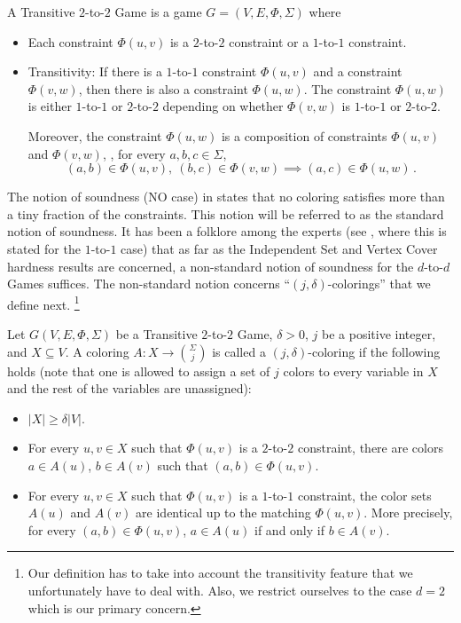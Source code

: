 \documentclass{toc}
\newcommand\card[1]{\left| {#1} \right|}
\begin{document}
\begin{definition}\label{def:trans_game}
A Transitive $2$-to-$2$ Game is a game $G=(V,E,\Phi,\Sigma)$ where
\begin{itemize}
\item Each constraint $\Phi(u,v)$ is a $2$-to-$2$ constraint or a $1$-to-$1$ constraint.
\item Transitivity: If there is a $1$-to-$1$ constraint $\Phi(u,v)$ and a constraint $\Phi(v,w)$, then there is also a constraint $\Phi(u,w)$. The constraint
      $\Phi(u,w)$ is either
  $1$-to-$1$ or $2$-to-$2$ depending on whether $\Phi(v,w)$ is $1$-to-$1$ or
  $2$-to-$2$. %
%

  Moreover, the constraint $\Phi(u,w)$
is a composition of constraints $\Phi(u,v)$ and $\Phi(v,w)$, \ie, for every $a,b,c \in \Sigma$,
$$ (a,b) \in \Phi(u,v), \ (b,c) \in  \Phi(v,w) \implies (a,c) \in \Phi(u,w)\,. $$%
\end{itemize}
\end{definition}

The notion of soundness (NO case) in   states that no coloring satisfies more than a tiny fraction of
the constraints. This notion will be referred to as the standard notion of soundness.
It has been a folklore among the experts (see \cite[Theorem 3.1]{KR08},
where this is stated for the $1$-to-$1$ case) that as far as the Independent Set and Vertex Cover
hardness results are concerned, a non-standard notion of soundness for the $d$-to-$d$ Games suffices. The non-standard notion concerns
``$(j,\delta)$-colorings'' that we define next. \footnote{Our definition has to take into account the transitivity feature that we unfortunately
have to deal with. Also, we restrict ourselves to the case $d=2$ which is our primary concern.}

\begin{definition}\label{def:j,delta}
Let $G(V,E,\Phi,\Sigma)$ be a Transitive $2$-to-$2$ Game, $\delta>0$, $j$ be a positive integer, and $X\subseteq V$.
A coloring $A \colon X\to {\Sigma \choose j}$ is called a $(j,\delta)$-coloring if the following holds
(note that one is allowed to assign a set of $j$ colors to every variable in $X$ and the rest of the variables are
unassigned):
\begin{itemize}
\item $\card{X}\geqslant \delta \card{V}$.
\item For every $u,v\in X$ such that $\Phi(u,v)$ is a $2$-to-$2$ constraint, there are colors $a \in A(u)$, $b \in A(v)$ such that
$(a,b)\in \Phi(u,v)$.
\item For every $u,v\in X$ such that $\Phi(u,v)$ is a $1$-to-$1$ constraint, the color sets $A(u)$ and $A(v)$ are identical up to
the matching $\Phi(u,v)$. More precisely, for every $(a,b) \in \Phi(u,v)$, $a \in A(u)$ if and only if $b \in A(v)$.
\end{itemize}
\end{definition}
\end{document}
